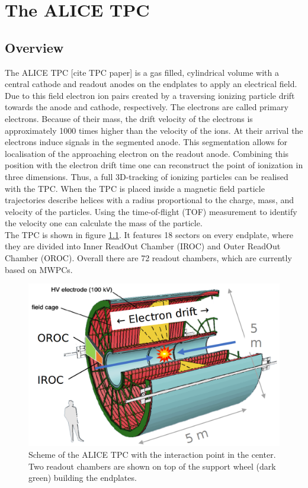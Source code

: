 \chapter{The ALICE TPC}
\section{Overview}
The ALICE TPC [cite TPC paper] is a gas filled, cylindrical volume with a central cathode and readout anodes on the endplates to apply an electrical field. Due to this field electron ion pairs created by a traversing ionizing particle drift towards the anode and cathode, respectively. The electrons are called primary electrons. Because of their mass, the drift velocity of the electrons is approximately 1000 times higher than the velocity of the ions. At their arrival the electrons induce signals in the segmented anode. This segmentation allows for localisation of the approaching electron on the readout anode. Combining this position with the electron drift time one can reconstruct the point of ionization in three dimensions. Thus, a full 3D-tracking of ionizing particles can be realised with the TPC. When the TPC is placed inside a magnetic field particle trajectories describe helices with a radius proportional to the charge, mass, and velocity of the particles. Using the time-of-flight (TOF) measurement to identify the velocity one can calculate the mass of the particle.\\
The TPC is shown in figure \ref{fig:tpc_sketch}. It features 18 sectors on every endplate, where they are divided into Inner ReadOut Chamber (IROC) and Outer ReadOut Chamber (OROC). Overall there are 72 readout chambers, which are currently based on MWPCs.  
\begin{figure}[]
		\includegraphics[width=\textwidth]{pictures/ALICE_TPC_scheme.png}
		\caption{Scheme of the ALICE TPC with the interaction point in the center. Two readout chambers are shown on top of the support wheel (dark green) building the endplates.}
		\label{fig:tpc_sketch}
\end{figure}
